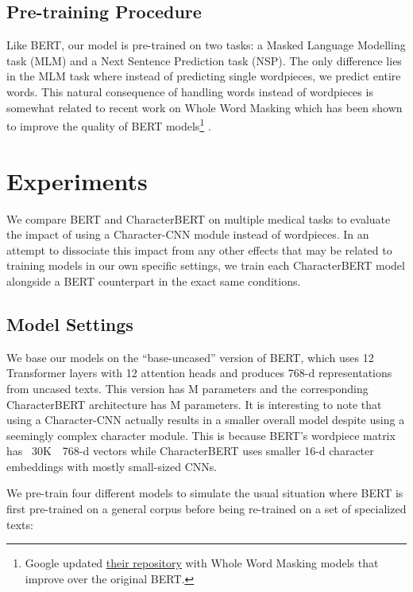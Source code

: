 \documentclass[11pt]{article}
\begin{document}
\subsection{Pre-training Procedure}

Like BERT, our model is pre-trained on two tasks: a Masked Language Modelling task (MLM) and a Next Sentence Prediction task (NSP). The only difference lies in the MLM task where instead of predicting single wordpieces, we predict entire words. This natural consequence of handling words instead of wordpieces is somewhat related to recent work on Whole Word Masking which has been shown to improve the quality of BERT models\footnote{Google updated \href{https://github.com/google-research/bert}{their repository} with Whole Word Masking models that improve over the original BERT.} \cite{cui2019pre}.

\section{Experiments}

We compare BERT and CharacterBERT on multiple medical tasks to evaluate the impact of using a Character-CNN module instead of wordpieces. In an attempt to dissociate this impact from any other effects that may be related to training models in our own specific settings, we train each CharacterBERT model alongside a BERT counterpart in the exact same conditions.

\subsection{Model Settings}\label{modelSettings}

We base our models on the ``base-uncased'' version of BERT, which uses 12 Transformer layers with 12 attention heads and produces 768-d representations from uncased texts. This version has M parameters and the corresponding CharacterBERT architecture has M parameters. It is interesting to note that using a Character-CNN actually results in a smaller overall model despite using a seemingly complex character module. This is because BERT's wordpiece matrix has ~30K~~\mbox{768-d} vectors while CharacterBERT uses smaller 16-d character embeddings with mostly small-sized CNNs.

We pre-train four different models to simulate the usual situation where BERT is first pre-trained on a general corpus before being re-trained on a set of specialized texts:
\end{document}
